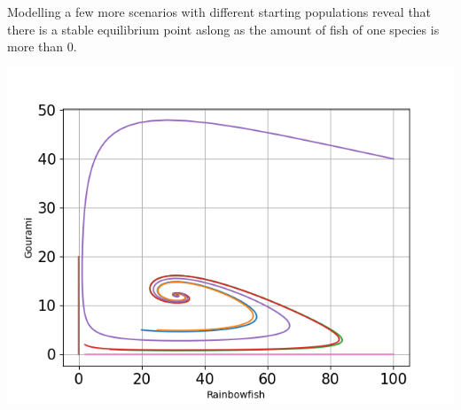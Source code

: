 \begin{flushleft}
    Modelling a few more scenarios with different
    starting populations reveal that there is a stable equilibrium point aslong as
    the amount of fish of one species is more than 0.
\end{flushleft}

\begin{center}
    \includegraphics[scale=0.45]{../figures/Figure_4.png}

\end{center}
